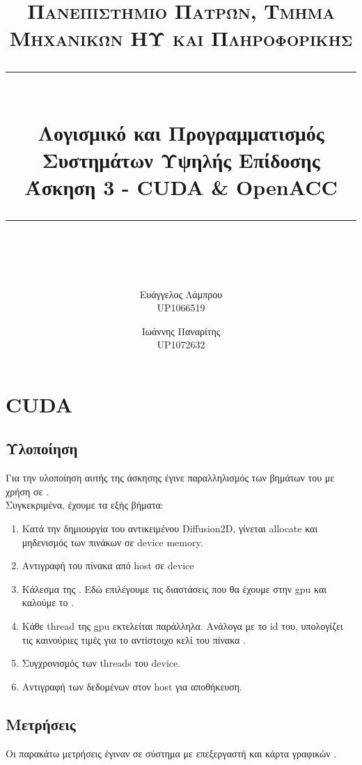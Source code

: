 \documentclass[11pt]{scrartcl} %
\title{	
	\normalfont\normalsize
	\textsc{Πανεπιστήμιο Πατρών, Τμήμα Μηχανικών ΗΥ και Πληροφορικής}\\ %
	\vspace{25pt} %
	\rule{\linewidth}{0.5pt}\\ %
	\vspace{20pt} %
    {\LARGE Λογισμικό και Προγραμματισμός Συστημάτων Υψηλής Επίδοσης\\ Άσκηση 3 - CUDA \& OpenACC}\\ %
	\vspace{12pt} %
	\rule{\linewidth}{2pt}\\ %
	\vspace{12pt} %
}
\author{Ευάγγελος Λάμπρου \\UP1066519 \and Ιωάννης Παναρίτης \\UP1072632} %
\date{} %
\begin{document}
\maketitle 

\section{CUDA}

\subsection{Υλοποίηση}

Για την υλοποίηση αυτής της άσκησης έγινε παραλληλισμός των βημάτων του  με χρήση  σε .\\
Συγκεκριμένα, έχουμε τα εξής βήματα:

\begin{enumerate}
    \item Κατά την δημιουργία του αντικειμένου Diffusion2D, γίνεται allocate και μηδενισμός των πινάκων σε device memory.
    \item Αντιγραφή του πίνακα  από host σε device
    \item Κάλεσμα της . Εδώ επιλέγουμε τις διαστάσεις που θα έχουμε στην gpu και καλούμε το .
    \item Κάθε thread της gpu εκτελείται παράλληλα. Ανάλογα με το id του, υπολογίζει τις καινούριες τιμές για το αντίστοιχο κελί του πίνακα .
    \item Συγχρονισμός των threads του device.
    \item Αντιγραφή των δεδομένων στον host για αποθήκευση.
\end{enumerate}

\subsection{Μετρήσεις}

Οι παρακάτω μετρήσεις έγιναν σε σύστημα με επεξεργαστή  και κάρτα γραφικών .

\end{document}
